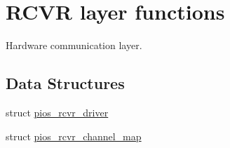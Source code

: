 \hypertarget{group___p_i_o_s___r_c_v_r}{\section{R\-C\-V\-R layer functions}
\label{group___p_i_o_s___r_c_v_r}
}


Hardware communication layer.  


\subsection*{Data Structures}
\begin{DoxyCompactItemize}
\item 
struct \hyperlink{structpios__rcvr__driver}{pios\-\_\-rcvr\-\_\-driver}
\item 
struct \hyperlink{structpios__rcvr__channel__map}{pios\-\_\-rcvr\-\_\-channel\-\_\-map}
\end{DoxyCompactItemize}
